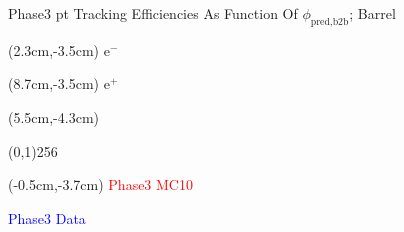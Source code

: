\documentclass[8pt]{beamer}
\begin{document}
\begin{frame}{Phase3 pt Tracking Efficiencies As Function Of $\phi_{\textrm{pred,b2b}}$; Barrel}
	
	\begin{textblock*}{2cm}(2.3cm,-3.5cm)
		$\textrm{e}^-$
	\end{textblock*}
	
	\begin{textblock*}{2cm}(8.7cm,-3.5cm)
		$\textrm{e}^+$
	\end{textblock*}
	
	
	
	\begin{textblock*}{11cm}(5.5cm,-4.3cm)
		
		\begin{center}
			\line(0,1){256}
		\end{center}
		
	\end{textblock*}
	
	
	
	\begin{textblock*}{4cm}(-0.5cm,-3.7cm)
		\textcolor{red}{Phase3 MC10}
		
		\textcolor{blue}{Phase3 Data}
	\end{textblock*}
	
	
	
	
\end{frame}
\end{document}
